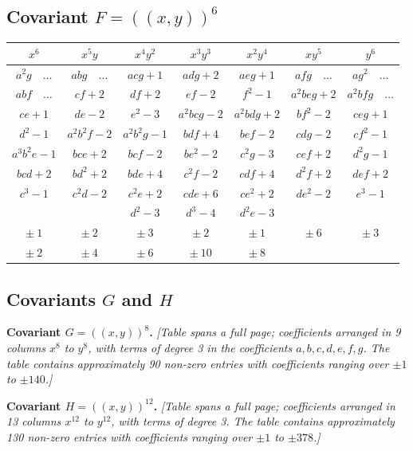 \documentclass[11pt,a4paper]{article}
\theoremstyle{cayley}
\begin{document}
\newpage

\subsection*{Covariant $F = (\!\!(x,y)\!\!)^{6}$}

\begin{center}
\small
\begin{tabular}{|c|c|c|c|c|c|c|}
\hline
$x^{6}$ & $x^{5}y$ & $x^{4}y^{2}$ & $x^{3}y^{3}$ & $x^{2}y^{4}$ & $xy^{5}$ & $y^{6}$ \\
\hline
$a^{2}g\quad\dots$ & $abg\quad\dots$ & $acg+1$ & $adg+2$ & $aeg+1$ & $afg\quad\dots$ & $ag^{2}\quad\dots$ \\
$abf\quad\dots$ & $cf+2$ & $df+2$ & $ef-2$ & $f^{2}-1$ & $a^{2}beg+2$ & $a^{2}bfg\quad\dots$ \\
$ce+1$ & $de-2$ & $e^{2}-3$ & $a^{2}bcg-2$ & $a^{2}bdg+2$ & $bf^{2}-2$ & $ceg+1$ \\
$d^{2}-1$ & $a^{2}b^{2}f-2$ & $a^{2}b^{2}g-1$ & $bdf+4$ & $bef-2$ & $cdg-2$ & $cf^{2}-1$ \\
$a^{3}b^{2}e-1$ & $bce+2$ & $bcf-2$ & $be^{2}-2$ & $c^{2}g-3$ & $cef+2$ & $d^{2}g-1$ \\
$bcd+2$ & $bd^{2}+2$ & $bde+4$ & $c^{2}f-2$ & $cdf+4$ & $d^{2}f+2$ & $def+2$ \\
$c^{3}-1$ & $c^{2}d-2$ & $c^{2}e+2$ & $cde+6$ & $ce^{2}+2$ & $de^{2}-2$ & $e^{3}-1$ \\
 &  & $d^{2}-3$ & $d^{3}-4$ & $d^{2}e-3$ &  &  \\
\hline
$\pm\ 1$ & $\pm\ 2$ & $\pm\ 3$ & $\pm\ 2$ & $\pm\ 1$ & $\pm\ 6$ & $\pm\ 3$ \\
$\pm\ 2$ & $\pm\ 4$ & $\pm\ 6$ & $\pm\ 10$ & $\pm\ 8$ &  &  \\
\hline
\end{tabular}
\end{center}

\newpage

\subsection*{Covariants $G$ and $H$}

\textbf{Covariant $G = (\!\!(x,y)\!\!)^{8}$.}
\textit{[Table spans a full page; coefficients arranged in 9 columns $x^{8}$ to $y^{8}$, with terms of degree 3 in the coefficients $a,b,c,d,e,f,g$. The table contains approximately 90 non-zero entries with coefficients ranging over $\pm1$ to $\pm140$.]}

\textbf{Covariant $H = (\!\!(x,y)\!\!)^{12}$.}
\textit{[Table spans a full page; coefficients arranged in 13 columns $x^{12}$ to $y^{12}$, with terms of degree 3. The table contains approximately 130 non-zero entries with coefficients ranging over $\pm1$ to $\pm378$.]}
\end{document}
